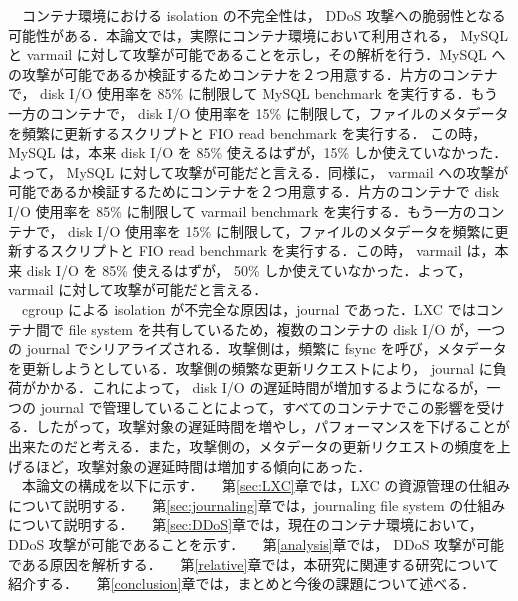 \documentclass[graduation-thesis]{jsarticle}
\begin{document}
　コンテナ環境における isolation の不完全性は， DDoS 攻撃への脆弱性となる可能性がある．本論文では，実際にコンテナ環境において利用される， MySQL と varmail に対して攻撃が可能であることを示し，その解析を行う．MySQL への攻撃が可能であるか検証するためコンテナを２つ用意する．片方のコンテナで， disk I/O 使用率を 85\% に制限して MySQL benchmark を実行する．もう一方のコンテナで， disk I/O 使用率を 15\% に制限して，ファイルのメタデータを頻繁に更新するスクリプトと FIO read benchmark を実行する． この時， MySQL は，本来 disk I/O を 85\% 使えるはずが，15\% しか使えていなかった．よって， MySQL に対して攻撃が可能だと言える．同様に， varmail への攻撃が可能であるか検証するためにコンテナを２つ用意する．片方のコンテナで disk I/O 使用率を 85\% に制限して varmail benchmark を実行する．もう一方のコンテナで， disk I/O 使用率を 15\% に制限して，ファイルのメタデータを頻繁に更新するスクリプトと FIO read benchmark を実行する．この時， varmail は，本来 disk I/O を 85\% 使えるはずが， 50\% しか使えていなかった．よって， varmail に対して攻撃が可能だと言える．\\
　cgroup による isolation が不完全な原因は，journal であった．LXC ではコンテナ間で file system を共有しているため，複数のコンテナの disk I/O が，一つの journal でシリアライズされる．攻撃側は，頻繁に fsync を呼び，メタデータを更新しようとしている．攻撃側の頻繁な更新リクエストにより， journal に負荷がかかる．これによって， disk I/O の遅延時間が増加するようになるが，一つの journal で管理していることによって，すべてのコンテナでこの影響を受ける．したがって，攻撃対象の遅延時間を増やし，パフォーマンスを下げることが出来たのだと考える．また，攻撃側の，メタデータの更新リクエストの頻度を上げるほど，攻撃対象の遅延時間は増加する傾向にあった．\\
　本論文の構成を以下に示す．
　第\ref{sec:LXC}章では，LXC の資源管理の仕組みについて説明する．
　第\ref{sec:journaling}章では，journaling file system の仕組みについて説明する．
　第\ref{sec:DDoS}章では，現在のコンテナ環境において， DDoS 攻撃が可能であることを示す．
　第\ref{analysis}章では， DDoS 攻撃が可能である原因を解析する．
　第\ref{relative}章では，本研究に関連する研究について紹介する．
　第\ref{conclusion}章では，まとめと今後の課題について述べる．
　
\clearpage
\end{document}
